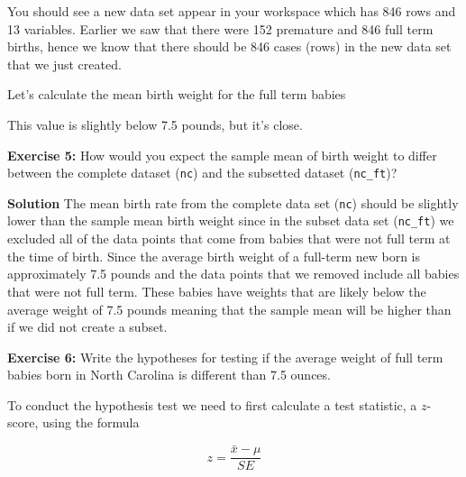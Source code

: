 \documentclass[
]{article}
\newenvironment{Shaded}{\begin{snugshade}}{\end{snugshade}}
\newcommand{\AttributeTok}[1]{\textcolor[rgb]{0.13,0.29,0.53}{#1}}
\newcommand{\ConstantTok}[1]{\textcolor[rgb]{0.56,0.35,0.01}{#1}}
\newcommand{\DecValTok}[1]{\textcolor[rgb]{0.00,0.00,0.81}{#1}}
\newcommand{\DocumentationTok}[1]{\textcolor[rgb]{0.56,0.35,0.01}{\textbf{\textit{#1}}}}
\newcommand{\FloatTok}[1]{\textcolor[rgb]{0.00,0.00,0.81}{#1}}
\newcommand{\FunctionTok}[1]{\textcolor[rgb]{0.13,0.29,0.53}{\textbf{#1}}}
\newcommand{\NormalTok}[1]{#1}
\newcommand{\OtherTok}[1]{\textcolor[rgb]{0.56,0.35,0.01}{#1}}
\newcommand{\SpecialCharTok}[1]{\textcolor[rgb]{0.81,0.36,0.00}{\textbf{#1}}}
\begin{document}
You should see a new data set appear in your workspace which has 846
rows and 13 variables. Earlier we saw that there were 152 premature and
846 full term births, hence we know that there should be 846 cases
(rows) in the new data set that we just created.

Let's calculate the mean birth weight for the full term babies

\begin{Shaded}
\end{Shaded}

This value is slightly below 7.5 pounds, but it's close.

\textbf{Exercise 5:} How would you expect the sample mean of birth
weight to differ between the complete dataset (\texttt{nc}) and the
subsetted dataset (\texttt{nc\_ft})?

\textbf{Solution} The mean birth rate from the complete data set
(\texttt{nc}) should be slightly lower than the sample mean birth weight
since in the subset data set (\texttt{nc\_ft}) we excluded all of the
data points that come from babies that were not full term at the time of
birth. Since the average birth weight of a full-term new born is
approximately 7.5 pounds and the data points that we removed include all
babies that were not full term. These babies have weights that are
likely below the average weight of 7.5 pounds meaning that the sample
mean will be higher than if we did not create a subset.

\textbf{Exercise 6:} Write the hypotheses for testing if the average
weight of full term babies born in North Carolina is different than 7.5
ounces.

To conduct the hypothesis test we need to first calculate a test
statistic, a \(z\)-score, using the formula

\[ z = \frac{\bar{x} - \mu}{SE} \]

\begin{Shaded}
\end{Shaded}
\end{document}
